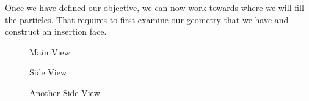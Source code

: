 \documentclass{tufte-book} %
\begin{document}
Once we have defined our objective, we can now work towards where we will fill the particles. That requires to first examine our geometry that we have and construct an insertion face.
\begin{figure}
  
  \caption{Main View}
  \label{MainView}
\end{figure}
\begin{figure}
  
  \caption{Side View}
  \label{SideView}
\end{figure}\begin{figure}
  
  \caption{Another Side View}
  \label{Side2View}
\end{figure}
\end{document}
